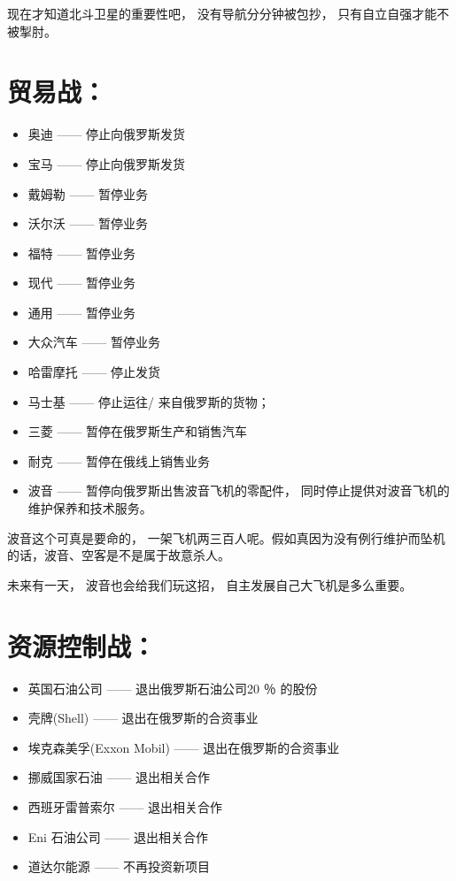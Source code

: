 \documentclass[UTF8, 11pt, oneside]{ctexart}
\begin{document}
现在才知道北斗卫星的重要性吧， 没有导航分分钟被包抄， 只有自立自强才能不被掣肘。


\section{贸易战：}


\begin{itemize}
    \item 奥迪 —— 停止向俄罗斯发货
    \item 宝马 —— 停止向俄罗斯发货
    \item 戴姆勒 —— 暂停业务
    \item 沃尔沃 —— 暂停业务
    \item 福特 —— 暂停业务
    \item 现代 —— 暂停业务
    \item 通用 —— 暂停业务
    \item 大众汽车 —— 暂停业务
    \item 哈雷摩托 —— 停止发货
    \item 马士基 —— 停止运往/ 来自俄罗斯的货物；
    \item 三菱 —— 暂停在俄罗斯生产和销售汽车
    \item 耐克 —— 暂停在俄线上销售业务
    \item 波音 —— 暂停向俄罗斯出售波音飞机的零配件， 同时停止提供对波音飞机的维护保养和技术服务。
\end{itemize}

波音这个可真是要命的， 一架飞机两三百人呢。假如真因为没有例行维护而坠机的话，波音、空客是不是属于故意杀人。

未来有一天， 波音也会给我们玩这招， 自主发展自己大飞机是多么重要。


\section{资源控制战：}

\begin{itemize}
    \item 英国石油公司 —— 退出俄罗斯石油公司20 ％ 的股份
    \item 壳牌(Shell) —— 退出在俄罗斯的合资事业
    \item 埃克森美孚(Exxon Mobil) —— 退出在俄罗斯的合资事业
    \item 挪威国家石油 —— 退出相关合作
    \item 西班牙雷普索尔 —— 退出相关合作
    \item Eni 石油公司 —— 退出相关合作
    \item 道达尔能源 —— 不再投资新项目
\end{itemize}
\end{document}

